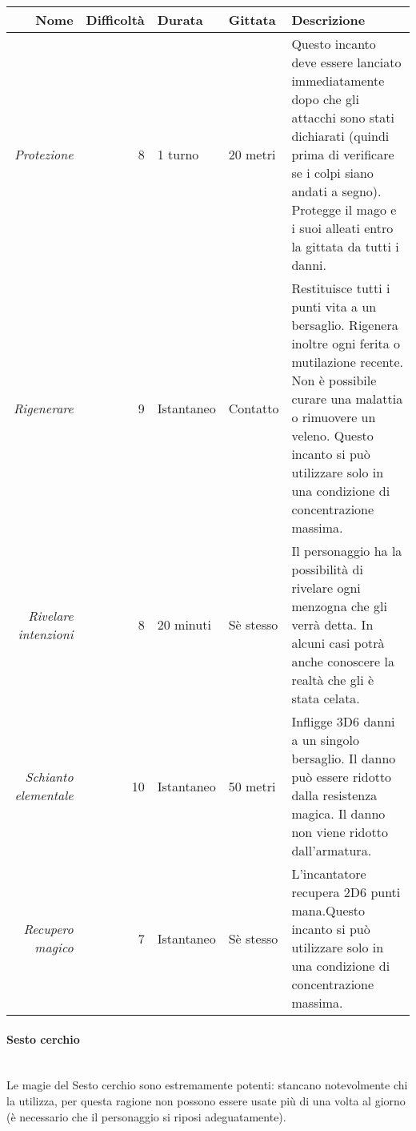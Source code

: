 \documentclass[../manuale_main.tex]{subfiles}
\begin{document}
\begin{tabularx}{\linewidth}{|N| D| T| G| Y|}
\hline
\textbf{Nome} & \textbf{Difficoltà} & \textbf{Durata} & \textbf{Gittata} & \textbf{Descrizione} \\ \hline\hline
\textit{Protezione} & 8 & 1 turno & 20 metri &Questo incanto deve essere lanciato immediatamente dopo che gli attacchi sono stati dichiarati (quindi prima di verificare se i colpi siano andati a segno). Protegge il mago e i suoi alleati entro la gittata da tutti i danni.  \\ \hline
\textit{Rigenerare} & 9 &Istantaneo  & Contatto  & Restituisce tutti i punti vita a un bersaglio. Rigenera inoltre ogni ferita o mutilazione recente. Non è possibile curare una malattia o rimuovere un veleno. Questo incanto si può utilizzare solo in una condizione di concentrazione massima.\\ \hline
\textit{Rivelare intenzioni} & 8 & 20 minuti & Sè stesso &Il personaggio ha la possibilità di rivelare ogni menzogna che gli verrà detta. In alcuni casi potrà anche conoscere la realtà che gli è stata celata.  \\ \hline
\textit{Schianto elementale} & 10  & Istantaneo & 50 metri &Infligge 3D6 danni a un singolo bersaglio. Il danno può essere ridotto dalla resistenza magica. Il danno non viene ridotto dall'armatura.\\ \hline
\textit{Recupero magico} & 7 & Istantaneo & Sè stesso & L'incantatore recupera 2D6 punti mana.Questo incanto si può utilizzare solo in una condizione di concentrazione massima.\\
\hline
\end{tabularx}

\paragraph{Sesto cerchio}\mbox{}\\

Le magie del Sesto cerchio sono estremamente potenti: stancano notevolmente chi la utilizza, per questa ragione non possono essere usate più di una volta al giorno (è necessario che il personaggio si riposi adeguatamente).
\end{document}
